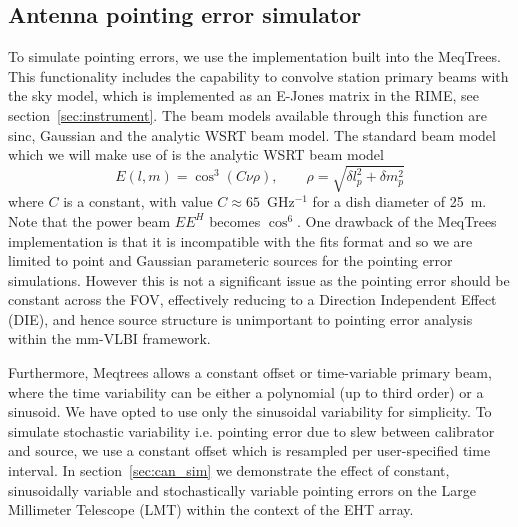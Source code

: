 \subsection{Antenna pointing error simulator}\label{sec:point_imp}

To simulate pointing errors, we use the implementation built into the {\sc MeqTrees}. This functionality includes the capability to convolve station primary beams with the sky model, which is implemented as an E-Jones matrix in the RIME, see section~\ref{sec:instrument}. The beam models available through this function are sinc, Gaussian and the analytic WSRT beam model. The standard beam model which we will make use of is the analytic WSRT beam model \citep{Popping_2008} 
\begin{equation}\label{eq:wsrt_beam}
E(l, m) = \cos^3(C\nu \rho),\qquad   \rho = \sqrt{\delta l_p^2 + \delta m_p^2}
\end{equation}
where $C$ is a constant, with value $C \approx 65$~GHz$^{-1}$ for a dish diameter of 25~m. Note that the power beam $EE^H$ becomes $\cos^6$.  One drawback of the {\sc MeqTrees} implementation is that it is incompatible with the {\sc fits} format and so we are limited to point and Gaussian parameteric sources for the pointing error simulations. However this is not a significant issue as the pointing error should be constant across the FOV, effectively reducing to a Direction Independent Effect (DIE), and hence source structure is unimportant to pointing error analysis within the mm-VLBI framework.


Furthermore, {\sc Meqtrees} allows a constant offset or time-variable primary beam, where the time variability can be either a polynomial (up to third order) or a sinusoid. We have opted to use only the sinusoidal variability for simplicity. To simulate stochastic variability i.e. pointing error due to slew between calibrator and source, we use a constant offset which is resampled per user-specified time interval. In section~\ref{sec:can_sim} we demonstrate the effect of constant, sinusoidally variable and stochastically variable pointing errors on the Large Millimeter Telescope (LMT) within the context of the EHT array.

